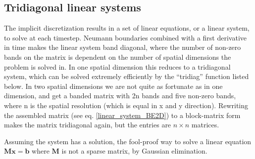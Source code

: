 \subsection{Tridiagonal linear systems}\label{tridiagonal_linear_systems}

The implicit discretization results in a set of linear equations, or a linear system, to solve at each timestep. 
Neumann boundaries combined with a first derivative in time makes the linear system band diagonal, where the number of non-zero bands on the matrix is dependent on the number of spatial dimensions the problem is solved in. 
In one spatial dimension this reduces to a tridiagonal system, which can be solved extremely efficiently by the ``tridiag'' function listed below.
In two spatial dimensions we are not quite as fortunate as in one dimension, and get a banded matrix with 2n bands and five non-zero bands, where n is the spatial resolution (which is equal in x and y direction). 
Rewriting the assembled matrix (see eq. \ref{linear_system_BE2D}) to a block-matrix form makes the matrix tridiagonal again, but the entries are $n\times n$ matrices. 


Assuming the system has a solution, the fool-proof way to solve a linear equation $\mathbf{M}\mathbf{x} = \mathbf{b}$ where $\mathbf{M}$ is not a sparse matrix, by Gaussian elimination.

